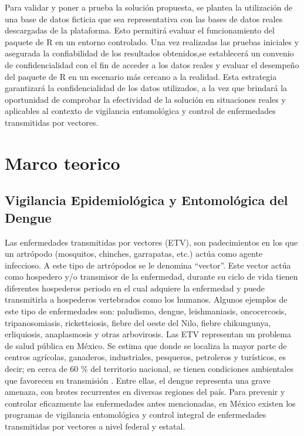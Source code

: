 \documentclass[
  letterpaper,
  twocolumn,
  landscape]{report}
\begin{document}
Para validar y poner a prueba la solución propuesta, se plantea la
utilización de una base de datos ficticia que sea representativa con las
bases de datos reales descargadas de la plataforma. Esto permitirá
evaluar el funcionamiento del paquete de R en un entorno controlado. Una
vez realizadas las pruebas iniciales y asegurada la confiabilidad de los
resultados obtenidos,se establecerá un convenio de confidencialidad con
el fin de acceder a los datos reales y evaluar el desempeño del paquete
de R en un escenario más cercano a la realidad. Esta estrategia
garantizará la confidencialidad de los datos utilizados, a la vez que
brindará la oportunidad de comprobar la efectividad de la solución en
situaciones reales y aplicables al contexto de vigilancia entomológica y
control de enfermedades transmitidas por vectores.


\chapter{Marco teorico}\label{marco-teorico}

\section{Vigilancia Epidemiológica y Entomológica del
Dengue}\label{vigilancia-epidemioluxf3gica-y-entomoluxf3gica-del-dengue}

Las enfermedades transmitidas por vectores (ETV), son padecimientos en
los que un artrópodo (mosquitos, chinches, garrapatas, etc.) actúa como
agente infeccioso. A este tipo de artrópodos se le denomina ``vector''.
Este vector actúa como hospedero y/o transmisor de la enfermedad,
durante su ciclo de vida tienen diferentes hospederos periodo en el cual
adquiere la enfermedad y puede transmitirla a hospederos vertebrados
como los humanos. Algunos ejemplos de este tipo de enfermedades son:
paludismo, dengue, leishmaniasis, oncocercosis, tripanosomiasis,
rickettsiosis, fiebre del oeste del Nilo, fiebre chikungunya,
erliquiosis, anaplasmosis y otras arbovirosis. Las ETV representan un
problema de salud pública en México. Se estima que donde se localiza la
mayor parte de centros agrícolas, ganaderos, industriales, pesqueros,
petroleros y turísticos, es decir; en cerca de 60 \% del territorio
nacional, se tienen condiciones ambientales que favorecen su transmisión
. Entre ellas, el dengue representa una grave amenaza, con brotes
recurrentes en diversas regiones del país. Para prevenir y controlar
eficazmente las enfermedades antes mencionadas, en México existen los
programas de vigilancia entomológica y control integral de enfermedades
transmitidas por vectores a nivel federal y estatal.
\end{document}
